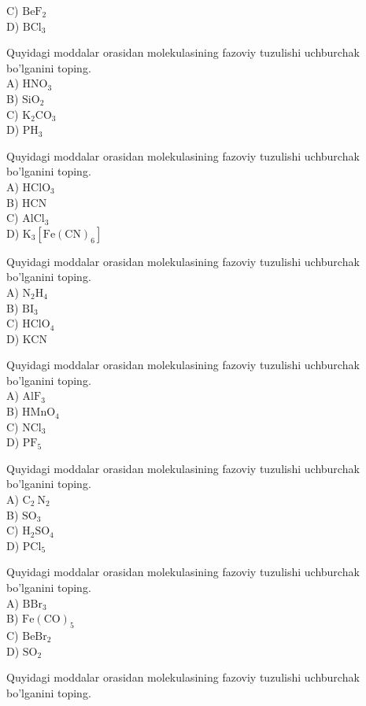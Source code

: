 C) $\mathrm{BeF}_{2}$\\
D) $\mathrm{BCl}_{3}$
  \item Quyidagi moddalar orasidan molekulasining fazoviy tuzulishi uchburchak bo'lganini toping.\\
A) $\mathrm{HNO}_{3}$\\
B) $\mathrm{SiO}_{2}$\\
C) $\mathrm{K}_{2} \mathrm{CO}_{3}$\\
D) $\mathrm{PH}_{3}$
  \item Quyidagi moddalar orasidan molekulasining fazoviy tuzulishi uchburchak bo'lganini toping.\\
A) $\mathrm{HClO}_{3}$\\
B) HCN\\
C) $\mathrm{AlCl}_{3}$\\
D) $\mathrm{K}_{3}\left[\mathrm{Fe}(\mathrm{CN})_{6}\right]$
  \item Quyidagi moddalar orasidan molekulasining fazoviy tuzulishi uchburchak bo'lganini toping.\\
A) $\mathrm{N}_{2} \mathrm{H}_{4}$\\
B) $\mathrm{BI}_{3}$\\
C) $\mathrm{HClO}_{4}$\\
D) KCN
  \item Quyidagi moddalar orasidan molekulasining fazoviy tuzulishi uchburchak bo'lganini toping.\\
A) $\mathrm{AlF}_{3}$\\
B) $\mathrm{HMnO}_{4}$\\
C) $\mathrm{NCl}_{3}$\\
D) $\mathrm{PF}_{5}$
  \item Quyidagi moddalar orasidan molekulasining fazoviy tuzulishi uchburchak bo'lganini toping.\\
A) $\mathrm{C}_{2} \mathrm{~N}_{2}$\\
B) $\mathrm{SO}_{3}$\\
C) $\mathrm{H}_{2} \mathrm{SO}_{4}$\\
D) $\mathrm{PCl}_{5}$
  \item Quyidagi moddalar orasidan molekulasining fazoviy tuzulishi uchburchak bo'lganini toping.\\
A) $\mathrm{BBr}_{3}$\\
B) $\mathrm{Fe}(\mathrm{CO})_{5}$\\
C) $\mathrm{BeBr}_{2}$\\
D) $\mathrm{SO}_{2}$
  \item Quyidagi moddalar orasidan molekulasining fazoviy tuzulishi uchburchak bo'lganini toping.\\
